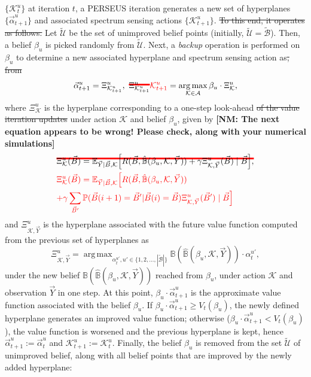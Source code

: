 \documentclass[10pt,twocolumn]{IEEEtran}
\newcommand{\sst}[1]{\st{#1}}
\newcommand{\nm}[1]{{\color{blue}\bf{[NM: #1]}}}
\DeclareMathOperator*{\argmax}{arg\,max}
\newcommand\mst[2][red]{\setbox0=\hbox{$#2$}\rlap{\raisebox{.45\ht0}{\textcolor{#1}{\rule{\wd0}{2pt}}}}#2}
\newcommand{\add}[1]{{\color{red}{#1}}}
\begin{document}
$\{\mathcal K_{t}^{u}\}$ at iteration $t$, a PERSEUS iteration generates a new set of hyperplanes $\{\vec{\alpha}_{t+1}^{u}\}$ and associated spectrum sensing actions
$\{\mathcal K_{t+1}^{u}\}$\add{, as we now describe}.\sst{ To this end, it operates as follows.} Let $\tilde{\mathcal{U}}$ be the set of unimproved belief points (initially, $\tilde{\mathcal{U}}{=}\tilde{\mathcal{B}}$). Then, a belief $\beta_u$ is picked randomly from $\tilde{\mathcal{U}}$. Next, a \emph{backup} operation is performed on $\beta_u$ to determine a new associated hyperplane and spectrum sensing action as\sst{, from} \cite{DBLP:journals/corr/abs-1109-2145}
\begin{equation}\label{20}
    \vec{\alpha}_{t+1}^{u}=\Xi_{\mathcal K_{t+1}^{u}}^{u},\ \mst{\Xi_{\mathcal K_{t+1}^{u}}^{u}}
    \add{\mathcal K_{t+1}^{u}}=\argmax_{\mathcal{K} \in \mathcal{A}} \beta_u \cdot \Xi_{\mathcal{K}}^{u},
\end{equation}
where $\Xi_{\mathcal{K}}^{u}$ is the hyperplane corresponding to a one-step look-ahead\sst{ of 
the value iteration updates} under action $\mathcal K$ and belief $\beta_u$, given by
\nm{The next equation appears to be wrong! Please check, along with your numerical simulations}
\begin{align*}
&\mst{        \Xi_{\mathcal{K}}^{u}(\vec{B}) = \mathbb{E}_{\vec{Y}|\vec{B}, \mathcal{K}} \Big[R(\vec{B}, \hat{\mathbb{B}}(\beta_{u}, \mathcal{K}, \vec{Y}))+\gamma 
        \Xi_{\mathcal{K}, \vec{Y}}^{u}(\vec{B})\mid\vec{B}\Big],       }\\
        &\add{        \Xi_{\mathcal{K}}^{u}(\vec{B}) = \mathbb{E}_{\vec{Y}|\vec{B}, \mathcal{K}} \Big[R(\vec{B}, \hat{\mathbb{B}}(\beta_{u}, \mathcal{K}, \vec{Y}))}\\
&\add{        +\gamma 
        \sum_{\vec{B}'}\mathbb{P}(\vec{B}(i+1) = \vec{B}'|\vec{B}(i)=\vec{B})
                \Xi_{\mathcal{K}, \vec{Y}}^{u}(\vec{B}')\mid\vec{B}\Big]}
\nonumber
\end{align*}
and $\Xi_{\mathcal{K}, \vec{Y}}^{u}$ is the hyperplane associated with the future value function computed from the previous set of hyperplanes as
\begin{equation}
    \Xi_{\mathcal{K}, \vec{Y}}^{u}=\argmax_{\alpha_{t}^{u'}, u' {\in} \{1, 2, \dots, |\tilde{\mathcal{B}}|\}} \mathbb{B}(\hat{\mathbb{B}}(\beta_{u}, \mathcal{K}, \vec{Y}))\cdot\alpha_{t}^{u'},
\nonumber
\end{equation}
under the new belief $\mathbb{B}(\hat{\mathbb{B}}(\beta_{u}, \mathcal{K}, \vec{Y}))$ reached from $\beta_{u}$, under action $\mathcal{K}$ and observation $\vec{Y}$ in one step. At this point, $\beta_{u}{\cdot}\vec{\alpha}_{t+1}^{u}$ is the approximate value function associated with the belief $\beta_u$. If $\beta_{u}{\cdot}\vec{\alpha}_{t+1}^{u}{\geq}V_{t}(\beta_{u})$, the newly defined hyperplane generates an improved value function; otherwise ($\beta_{u}{\cdot}\vec{\alpha}_{t+1}^{u}{<}V_{t}(\beta_{u})$), the value function is worsened and the previous hyperplane is kept, hence $\vec{\alpha}_{t+1}^{u}{:=}\vec{\alpha}_{t}^{u}$ and $\mathcal K_{t+1}^{u}{:=}\mathcal K_{t}^{u}$. Finally, the belief $\beta_u$ is removed from the set $\tilde{\mathcal{U}}$ of unimproved belief, along with all belief points that are improved by the newly added hyperplane:
\end{document}
